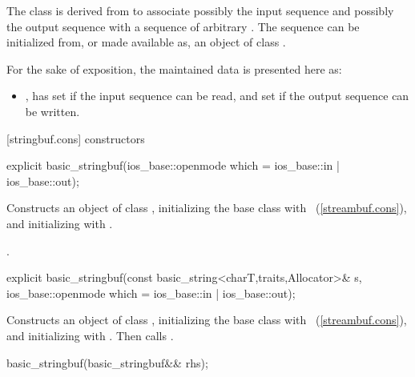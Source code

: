 \pnum
The class
is derived from
to associate possibly the input sequence and possibly
the output sequence with a sequence of arbitrary
.
The sequence can be initialized from, or made available as, an object of class
.

\pnum
For the sake of exposition, the maintained data is presented here as:
\begin{itemize}
\item
{},
has
set if the input sequence can be read, and
set if the output sequence can be written.
\end{itemize}

[stringbuf.cons]{  constructors}

%
\begin{itemdecl}
explicit basic_stringbuf(ios_base::openmode which =
                         ios_base::in | ios_base::out);
\end{itemdecl}

\begin{itemdescr}
\pnum
\effects
Constructs an object of class
,
initializing the base class with
~(\ref{streambuf.cons}), and initializing
with .

\pnum
\postcondition
{}.
\end{itemdescr}

%
\begin{itemdecl}
explicit basic_stringbuf(const basic_string<charT,traits,Allocator>& s,
                         ios_base::openmode which = ios_base::in | ios_base::out);
\end{itemdecl}

\begin{itemdescr}
\pnum
\effects
Constructs an object of class
,
initializing the base class with
~(\ref{streambuf.cons}), and initializing
with .
Then calls .
\end{itemdescr}

%
\begin{itemdecl}
basic_stringbuf(basic_stringbuf&& rhs);
\end{itemdecl}

